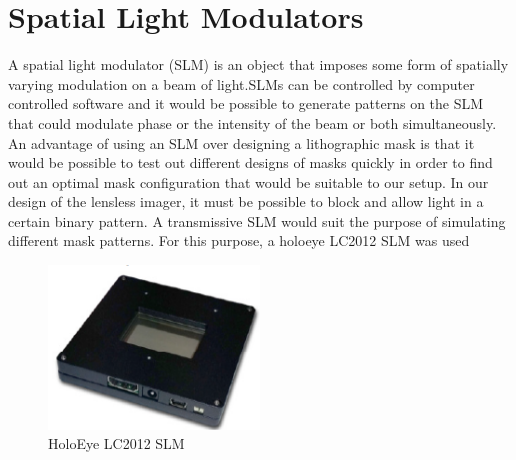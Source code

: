 \section{Spatial Light Modulators}
A spatial light modulator (SLM) is an object that imposes some form of spatially varying modulation on a beam of light\cite{SLMWiki}.SLMs can be controlled by computer controlled software and it would be possible to generate patterns on the SLM that could modulate phase or the intensity of the beam or both simultaneously. An advantage of using an SLM over designing a lithographic mask is that it would be possible to test out different designs of masks quickly in order to find out an optimal mask configuration that would be suitable to our setup. In our design of the lensless imager, it must be possible to block and allow light in a certain binary pattern. A transmissive SLM would suit the purpose of simulating different mask patterns. For this purpose, a holoeye LC2012 SLM was used 

\begin{figure}[ht]
\centering
\includegraphics[width=0.5\textwidth]{pics/slm}
\caption{HoloEye LC2012 SLM}
\label{fig:slm}
\end{figure}
